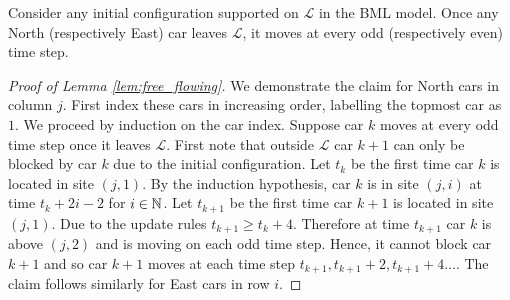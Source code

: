 \documentclass[reqno]{amsart}
\begin{document}
\begin{lemma} \label{lem:free_flowing}
     Consider any initial configuration supported on $\mathcal{L}$ in the BML model. Once any North (respectively East) car leaves $\mathcal{L}$, it moves at every odd (respectively even) time step. \end{lemma}
\begin{proof}[Proof of Lemma \ref{lem:free_flowing}]
    We demonstrate the claim for North cars in column $j$. First index these cars in increasing order, labelling the topmost car as $1$. We proceed by induction on the car index. Suppose car $k$ moves at every odd time step once it leaves $\mathcal{L}$. First note that outside $\mathcal{L}$ car $k+1$ can only be blocked by car $k$ due to the initial configuration. Let $t_k$ be the first time car $k$ is located in site $(j,1)$. By the induction hypothesis, car $k$ is in site $(j,i)$ at time $t_k+2i-2$ for $i \in \mathbb{N}$. Let $t_{k+1}$ be the first time car $k+1$ is located in site $(j,1)$.
    Due to the update rules $t_{k+1} \geq t_k + 4$. Therefore at time $t_{k+1}$ car $k$ is above $(j,2)$ and is moving on each odd time step. Hence, it cannot block car $k+1$ and so car $k+1$ moves at each time step $t_{k+1}, t_{k+1} +2, t_{k+1} + 4 \ldots $.
    The claim follows similarly for East cars in row $i$.
\end{proof}
\end{document}
